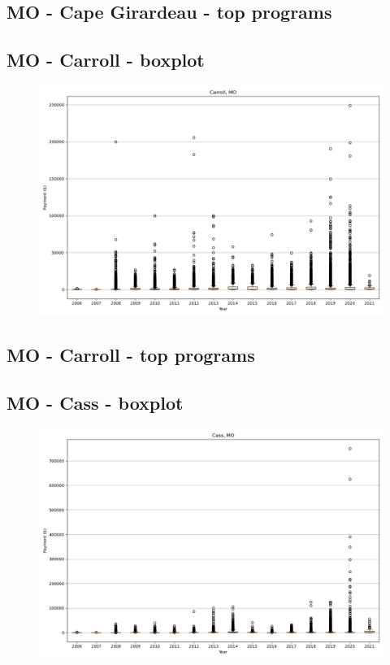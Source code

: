 \subsection*{MO - Cape Girardeau - top programs}

\newpage
\subsection*{MO - Carroll - boxplot}
\begin{figure}[h]
\centering
\includegraphics[width=7in]{../output/boxplots/counties/Carroll-MO_boxplot.png}
\end{figure}


\subsection*{MO - Carroll - top programs}

\newpage
\subsection*{MO - Cass - boxplot}
\begin{figure}[h]
\centering
\includegraphics[width=7in]{../output/boxplots/counties/Cass-MO_boxplot.png}
\end{figure}


